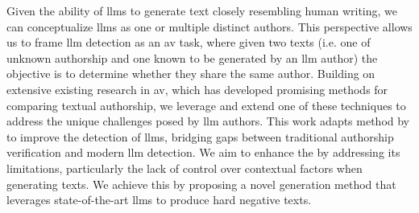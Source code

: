 Given the ability of \acp{llm} to generate text closely resembling human writing, we can conceptualize \acp{llm} as one or multiple distinct authors.
This perspective allows us to frame \ac{llm} detection as an \ac{av} task, where given two texts (i.e. one of unknown authorship and one known to be generated by an \ac{llm} author) the objective is to determine whether they share the same author.
Building on extensive existing research in \ac{av}, which has developed promising methods for comparing textual authorship, we leverage and extend one of these techniques to address the unique challenges posed by \ac{llm} authors. 
This work adapts \imp{} method by \citet{koppel_determining_2014} to improve the detection of \acp{llm}, bridging gaps between traditional authorship verification and modern \ac{llm} detection.
We aim to enhance the \impAppr{} by addressing its limitations, particularly the lack of control over contextual factors when generating \imp{} texts.
We achieve this by proposing a novel \imp{} generation method that leverages state-of-the-art \acp{llm} to produce hard negative \imp{} texts.


